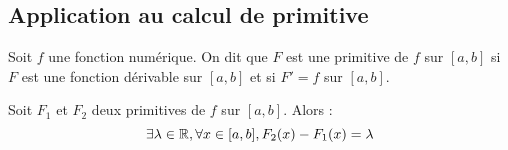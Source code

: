 \documentclass[12pt,twoside,a4paper]{article}
\begin{document}
		\subsection{Application au calcul de primitive}
			\begin{defi}
				Soit $f$ une fonction num\'erique. On dit que $F$ est une primitive de $f$ sur $[a,b]$ si $F$ est une fonction d\'erivable sur $[a,b]$ et si $F'=f$ sur $[a,b]$.
			\end{defi}
			\begin{prop}
				Soit $F_1$ et $F_2$ deux primitives de $f$ sur $[a,b]$. Alors :
				$$
					\exists\lambda\in\mathbb{R},\forall x\in[a,b],F_2(x)-F_1(x)=\lambda
				$$
			\end{prop}
\end{document}
